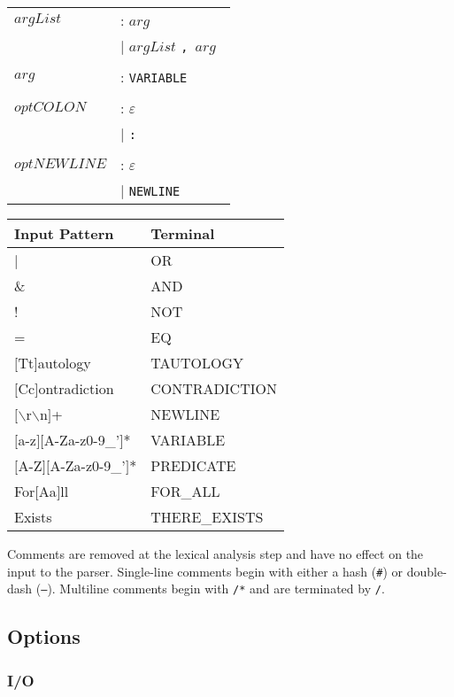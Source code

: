 \begin{tabular}{ll}
		$argList$ & :    $arg$ \\
		{} & $\mid$      $argList$ \tt{,} $arg$ \\
		\\

		$arg$ & :        \tt{VARIABLE} \\
		\\

		$optCOLON$ & :   $\varepsilon$ \\
		{} & $\mid$      \tt{:} \\
		\\

		$optNEWLINE$ & : $\varepsilon$ \\
		{} & $\mid$      \tt{NEWLINE} \\
		\end{tabular}

		{\tt \begin{tabular}{|l|l|}
			\hline
			\textbf{Input Pattern} & \textbf{Terminal} \\
			\hline
			|                    & OR  \\
			\&                   & AND \\
			!                    & NOT \\
			=                    & EQ  \\
			$[$Tt$]$autology     & TAUTOLOGY \\
			$[$Cc$]$ontradiction & CONTRADICTION \\
			$[\backslash$r$\backslash$n$]$+ & NEWLINE \\
			$[$a-z$][$A-Za-z0-9\_'$]$* & VARIABLE \\
			$[$A-Z$][$A-Za-z0-9\_'$]$* & PREDICATE \\
			For$[$Aa$]$ll        & FOR\_ALL \\
			Exists               & THERE\_EXISTS \\
			\hline
		\end{tabular} }

		Comments are removed at the lexical analysis step and have no effect on
		the input to the parser.  Single-line comments begin with either a hash
		({\tt \#}) or double-dash ({\tt --}). Multiline comments begin with
		{\tt /*} and are terminated by {\tt */}.

	\subsection{Options}

		\subsubsection{I/O}

